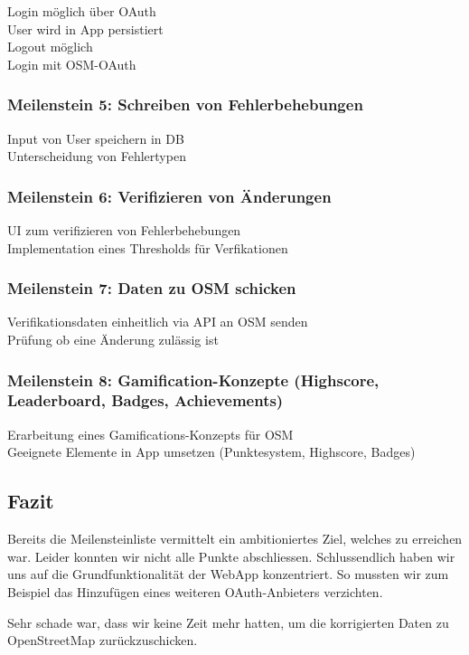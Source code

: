 \tick Login möglich über OAuth \\
\tick User wird in App persistiert \\
\tick Logout möglich \\
\cross Login mit OSM-OAuth

\subsubsection{Meilenstein 5: Schreiben von Fehlerbehebungen}

\tick Input von User speichern in DB \\
\tick Unterscheidung von Fehlertypen

\subsubsection{Meilenstein 6: Verifizieren von Änderungen}

\tick UI zum verifizieren von Fehlerbehebungen \\
\tick Implementation eines Thresholds für Verfikationen

\subsubsection{Meilenstein 7: Daten zu OSM schicken}

\cross Verifikationsdaten einheitlich via API an OSM senden \\
\cross Prüfung ob eine Änderung zulässig ist

\subsubsection{Meilenstein 8: Gamification-Konzepte (Highscore, Leaderboard, Badges, Achievements)}

\tick Erarbeitung eines Gamifications-Konzepts für OSM \\
\tick Geeignete Elemente in App umsetzen (Punktesystem, Highscore, Badges)

\subsection{Fazit}
Bereits die Meilensteinliste vermittelt ein ambitioniertes Ziel, welches zu erreichen war.
Leider konnten wir nicht alle Punkte abschliessen.
Schlussendlich haben wir uns auf die Grundfunktionalität der \gls{WebApp} konzentriert.
So mussten wir zum Beispiel das Hinzufügen eines weiteren \gls{OAuth}-Anbieters verzichten.

Sehr schade war, dass wir keine Zeit mehr hatten, um die korrigierten Daten zu OpenStreetMap zurückzuschicken.
